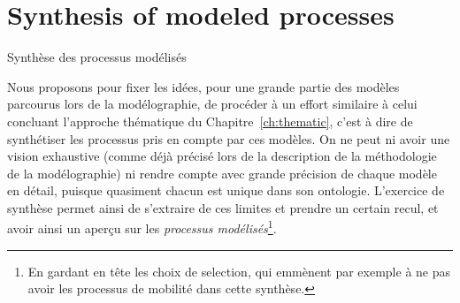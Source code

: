 


\newpage

\section*{Synthesis of modeled processes}{Synthèse des processus modélisés}



Nous proposons pour fixer les idées, pour une grande partie des modèles parcourus lors de la modélographie, de procéder à un effort similaire à celui concluant l'approche thématique du Chapitre~\ref{ch:thematic}, c'est à dire de synthétiser les processus pris en compte par ces modèles. On ne peut ni avoir une vision exhaustive (comme déjà précisé lors de la description de la méthodologie de la modélographie) ni rendre compte avec grande précision de chaque modèle en détail, puisque quasiment chacun est unique dans son ontologie. L'exercice de synthèse permet ainsi de s'extraire de ces limites et prendre un certain recul, et avoir ainsi un aperçu sur les \emph{processus modélisés}\footnote{En gardant en tête les choix de selection, qui emmènent par exemple à ne pas avoir les processus de mobilité dans cette synthèse.}.



